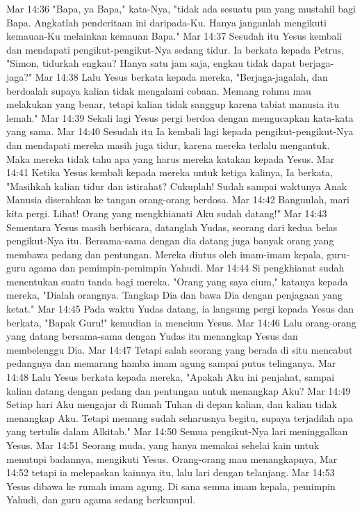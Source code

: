 Mar 14:36  "Bapa, ya Bapa," kata-Nya, "tidak ada sesuatu pun yang mustahil bagi Bapa. Angkatlah penderitaan ini daripada-Ku. Hanya janganlah mengikuti kemauan-Ku melainkan kemauan Bapa."
Mar 14:37  Sesudah itu Yesus kembali dan mendapati pengikut-pengikut-Nya sedang tidur. Ia berkata kepada Petrus, "Simon, tidurkah engkau? Hanya satu jam saja, engkau tidak dapat berjaga-jaga?"
Mar 14:38  Lalu Yesus berkata kepada mereka, "Berjaga-jagalah, dan berdoalah supaya kalian tidak mengalami cobaan. Memang rohmu mau melakukan yang benar, tetapi kalian tidak sanggup karena tabiat manusia itu lemah."
Mar 14:39  Sekali lagi Yesus pergi berdoa dengan mengucapkan kata-kata yang sama.
Mar 14:40  Sesudah itu Ia kembali lagi kepada pengikut-pengikut-Nya dan mendapati mereka masih juga tidur, karena mereka terlalu mengantuk. Maka mereka tidak tahu apa yang harus mereka katakan kepada Yesus.
Mar 14:41  Ketika Yesus kembali kepada mereka untuk ketiga kalinya, Ia berkata, "Masihkah kalian tidur dan istirahat? Cukuplah! Sudah sampai waktunya Anak Manusia diserahkan ke tangan orang-orang berdosa.
Mar 14:42  Bangunlah, mari kita pergi. Lihat! Orang yang mengkhianati Aku sudah datang!"
Mar 14:43  Sementara Yesus masih berbicara, datanglah Yudas, seorang dari kedua belas pengikut-Nya itu. Bersama-sama dengan dia datang juga banyak orang yang membawa pedang dan pentungan. Mereka diutus oleh imam-imam kepala, guru-guru agama dan pemimpin-pemimpin Yahudi.
Mar 14:44  Si pengkhianat sudah menentukan suatu tanda bagi mereka. "Orang yang saya cium," katanya kepada mereka, "Dialah orangnya. Tangkap Dia dan bawa Dia dengan penjagaan yang ketat."
Mar 14:45  Pada waktu Yudas datang, ia langsung pergi kepada Yesus dan berkata, "Bapak Guru!" kemudian ia mencium Yesus.
Mar 14:46  Lalu orang-orang yang datang bersama-sama dengan Yudas itu menangkap Yesus dan membelenggu Dia.
Mar 14:47  Tetapi salah seorang yang berada di situ mencabut pedangnya dan memarang hamba imam agung sampai putus telinganya.
Mar 14:48  Lalu Yesus berkata kepada mereka, "Apakah Aku ini penjahat, sampai kalian datang dengan pedang dan pentungan untuk menangkap Aku?
Mar 14:49  Setiap hari Aku mengajar di Rumah Tuhan di depan kalian, dan kalian tidak menangkap Aku. Tetapi memang sudah seharusnya begitu, supaya terjadilah apa yang tertulis dalam Alkitab."
Mar 14:50  Semua pengikut-Nya lari meninggalkan Yesus.
Mar 14:51  Seorang muda, yang hanya memakai sehelai kain untuk menutupi badannya, mengikuti Yesus. Orang-orang mau menangkapnya,
Mar 14:52  tetapi ia melepaskan kainnya itu, lalu lari dengan telanjang.
Mar 14:53  Yesus dibawa ke rumah imam agung. Di sana semua imam kepala, pemimpin Yahudi, dan guru agama sedang berkumpul.
